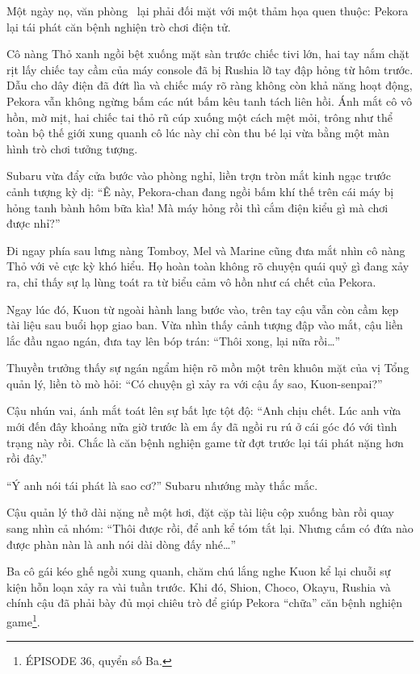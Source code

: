 \documentclass[../main.tex]{subfiles}
\begin{document}
Một ngày nọ, văn phòng \hll\ lại phải đối mặt với một thảm họa quen thuộc: Pekora lại tái phát căn bệnh nghiện trò chơi điện tử.

Cô nàng Thỏ xanh ngồi bệt xuống mặt sàn trước chiếc tivi lớn, hai tay nắm chặt rịt lấy chiếc tay cầm của máy console đã bị Rushia lỡ tay đập hỏng từ hôm trước. Dẫu cho dây điện đã đứt lìa và chiếc máy rõ ràng không còn khả năng hoạt động, Pekora vẫn không ngừng bấm các nút bấm kêu tanh tách liên hồi. Ánh mắt cô vô hồn, mờ mịt, hai chiếc tai thỏ rũ cúp xuống một cách mệt mỏi, trông như thể toàn bộ thế giới xung quanh cô lúc này chỉ còn thu bé lại vừa bằng một màn hình trò chơi tưởng tượng.


Subaru vừa đẩy cửa bước vào phòng nghỉ, liền trợn tròn mắt kinh ngạc trước cảnh tượng kỳ dị: ``Ê này, Pekora-chan đang ngồi bấm khí thế trên cái máy bị hỏng tanh bành hôm bữa kìa! Mà máy hỏng rồi thì cắm điện kiểu gì mà chơi được nhỉ?''

Đi ngay phía sau lưng nàng Tomboy, Mel và Marine cũng đưa mắt nhìn cô nàng Thỏ với vẻ cực kỳ khó hiểu. Họ hoàn toàn không rõ chuyện quái quỷ gì đang xảy ra, chỉ thấy sự lạ lùng toát ra từ biểu cảm vô hồn như cá chết của Pekora.

Ngay lúc đó, Kuon từ ngoài hành lang bước vào, trên tay cậu vẫn còn cầm kẹp tài liệu sau buổi họp giao ban. Vừa nhìn thấy cảnh tượng đập vào mắt, cậu liền lắc đầu ngao ngán, đưa tay lên bóp trán: ``Thôi xong, lại nữa rồi\dots''

Thuyền trưởng thấy sự ngán ngẩm hiện rõ mồn một trên khuôn mặt của vị Tổng quản lý, liền tò mò hỏi: ``Có chuyện gì xảy ra với cậu ấy sao, Kuon-senpai?''

Cậu nhún vai, ánh mắt toát lên sự bất lực tột độ: ``Anh chịu chết. Lúc anh vừa mới đến đây khoảng nửa giờ trước là em ấy đã ngồi ru rú ở cái góc đó với tình trạng này rồi. Chắc là căn bệnh nghiện game từ đợt trước lại tái phát nặng hơn rồi đây.''

``Ý anh nói tái phát là sao cơ?'' Subaru nhướng mày thắc mắc.

Cậu quản lý thở dài nặng nề một hơi, đặt cặp tài liệu cộp xuống bàn rồi quay sang nhìn cả nhóm: ``Thôi được rồi, để anh kể tóm tắt lại. Nhưng cấm có đứa nào được phàn nàn là anh nói dài dòng đấy nhé\dots''

Ba cô gái kéo ghế ngồi xung quanh, chăm chú lắng nghe Kuon kể lại chuỗi sự kiện hỗn loạn xảy ra vài tuần trước. Khi đó, Shion, Choco, Okayu, Rushia và chính cậu đã phải bày đủ mọi chiêu trò để giúp Pekora ``chữa'' căn bệnh nghiện game\footnote{{\flaregothic ÉPISODE 36}, quyển số Ba.}.
\end{document}
